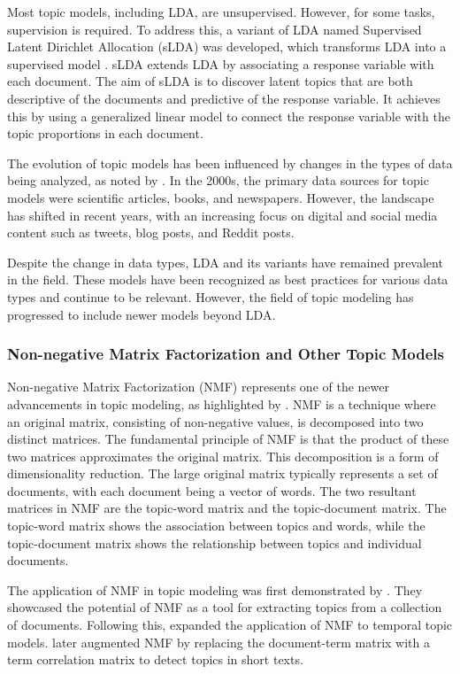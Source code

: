 \documentclass{article}
\begin{document}
Most topic models, including LDA, are unsupervised. However, for some tasks, supervision is required. To address this, a variant of LDA named Supervised Latent Dirichlet Allocation (sLDA) was developed, which transforms LDA into a supervised model \cite{mcauliffe_supervised_2007}. sLDA extends LDA by associating a response variable with each document. The aim of sLDA is to discover latent topics that are both descriptive of the documents and predictive of the response variable. It achieves this by using a generalized linear model to connect the response variable with the topic proportions in each document.

The evolution of topic models has been influenced by changes in the types of data being analyzed, as noted by \citet{churchill_evolution_2022}. In the 2000s, the primary data sources for topic models were scientific articles, books, and newspapers. However, the landscape has shifted in recent years, with an increasing focus on digital and social media content such as tweets, blog posts, and Reddit posts.

Despite the change in data types, LDA and its variants have remained prevalent in the field. These models have been recognized as best practices for various data types and continue to be relevant. However, the field of topic modeling has progressed to include newer models beyond LDA.

\subsubsection{Non-negative Matrix Factorization and Other Topic Models}
Non-negative Matrix Factorization (NMF) represents one of the newer advancements in topic modeling, as highlighted by \citet{churchill_evolution_2022}. NMF is a technique where an original matrix, consisting of non-negative values, is decomposed into two distinct matrices. The fundamental principle of NMF is that the product of these two matrices approximates the original matrix. This decomposition is a form of dimensionality reduction. The large original matrix typically represents a set of documents, with each document being a vector of words. The two resultant matrices in NMF are the topic-word matrix and the topic-document matrix. The topic-word matrix shows the association between topics and words, while the topic-document matrix shows the relationship between topics and individual documents.

The application of NMF in topic modeling was first demonstrated by \citet{shahnaz_document_2006}. They showcased the potential of NMF as a tool for extracting topics from a collection of documents. Following this, \cite{kasiviswanathan_emerging_2011} expanded the application of NMF to temporal topic models. \citet{yan_learning_2013} later augmented NMF by replacing the document-term matrix with a term correlation matrix to detect topics in short texts.
\end{document}
